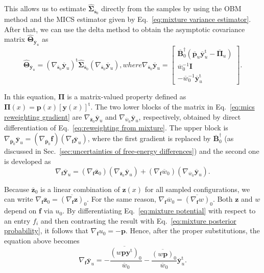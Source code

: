 \documentclass[journal=jctcce,manuscript=article,layout=twocolumn]{achemso}
\newcommand{\mt}[1]{\boldsymbol{\mathbf{#1}}}   %
\newcommand{\vt}[1]{\boldsymbol{\mathbf{#1}}}   %
\newcommand{\tr}[1]{#1^\text{t}}                %
\newcommand{\avg}[1]{\overline{#1}}             %
\begin{document}
This allows us to estimate $\hat{\mt \Sigma}_{\avg{\vt s}_0}$ directly from the samples by using the OBM method and the MICS estimator given by Eq.~\eqref{eq:mixture variance estimator}. After that, we can use the delta method to obtain the asymptotic covariance matrix $\hat{\mt \Theta}_{\avg{\vt y}_u}$ as
\begin{subequations}
\label{eq:mics reweighting}
\begin{equation}
\label{eq:mics reweighting delta method}
\hat{\mt \Theta}_{\avg{\vt y}_u} = \tr{(\nabla_{\avg{\vt s}_0} {\avg{\vt y}_u})} \hat{\mt \Sigma}_{\avg{\vt s}_0} (\nabla_{\avg{\vt s}_0} {\avg{\vt y}_u}),
\end{equation}
where
\begin{equation}
\label{eq:mics reweighting gradient}
\nabla_{\avg{\vt s}_0} {\avg{\vt y}_u} = \left[\begin{array}{c}
\avg{\mt B}_0^\dag (\avg{\vt p}_u \tr{\avg{\vt y}}_u - \avg{\mt \Pi}_u) \\
\avg{w}_0^{-1} {\mt I} \\
-\avg{w}_0^{-1} \tr{\avg{\vt y}}_u
\end{array}\right].
\end{equation}
\end{subequations}

In this equation, $\mt \Pi$ is a matrix-valued property defined as $\mt \Pi(x) = \vt p(x) \tr{[\vt y(x)]}$. The two lower blocks of the matrix in Eq.~\eqref{eq:mics reweighting gradient} are $\nabla_{\avg{\vt z}_0} {\avg{\vt y}_u}$ and $\nabla_{\avg{w}_0} {\avg{\vt y}_u}$, respectively, obtained by direct differentiation of Eq.~\eqref{eq:reweighting from mixture}. The upper block is $\nabla_{\avg{\vt p}_0} {\avg{\vt y}_u}  = (\nabla_{\avg{\vt p}_0} {\vt f})(\nabla_{\vt f} {\avg{\vt y}_u})$, where the first gradient is replaced by $\avg{\mt B}_0^\dag$ (as discussed in Sec.~\ref{sec:uncertainties of free-energy differences}) and the second one is developed as
\begin{equation*}
\nabla_{\vt f} {\avg{\vt y}_u} = (\nabla_{\vt f} {\avg{\vt z}_0}) (\nabla_{\avg{\vt z}_0} {\avg{\vt y}_u}) + (\nabla_{\vt f} {\avg{w}_0}) (\nabla_{\avg{w}_0} {\avg{\vt y}_u}).
\end{equation*}

Because $\avg{\vt z}_0$ is a linear combination of $\vt z(x)$ for all sampled configurations, we can write $\nabla_{\vt f} {\avg{\vt z}_0} = \avg{(\nabla_{\vt f}{\vt z})}_0$. For the same reason, $\nabla_{\vt f} {\avg{w}_0} = \avg{(\nabla_{\vt f}{w})}_0$. Both $\vt z$ and $w$ depend on $\vt f$ via $u_0$. By differentiating Eq.~\eqref{eq:mixture potential} with respect to an entry $f_i$ and then contrasting the result with Eq.~\eqref{eq:mixture posterior probability}, it follows that $\nabla_{\vt f}u_0 = -{\vt p}$. Hence, after the proper substitutions, the equation above becomes
\begin{equation*}
\nabla_{\vt f} {\avg{\vt y}_u} = -\frac{\avg{(w{\vt p}\tr{\vt y})}_0}{\avg{w}_0} - \frac{\avg{(w {\vt p})}_0}{\avg{w}_0} \tr{\avg{\vt y}}_u.
\end{equation*}
\end{document}
